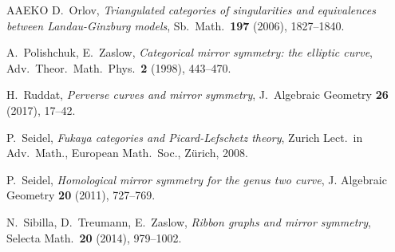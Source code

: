 \begin{thebibliography}{AAEKO}
   D.~Orlov, {\sl Triangulated categories of singularities and equivalences
   between Landau-Ginzburg models}, Sb.\ Math.\ {\bf 197} (2006), 1827--1840.

   A.~Polishchuk, E.~Zaslow,
   {\sl Categorical mirror symmetry: the elliptic curve},
   Adv.\ Theor.\ Math.\ Phys.\ {\bf 2} (1998), 443--470.

   H.~Ruddat,
   {\sl Perverse curves and mirror symmetry},
   J.\ Algebraic Geometry {\bf 26} (2017), 17--42.

   P.~Seidel,
   {\it Fukaya categories and Picard-Lefschetz theory},
   Zurich Lect.\ in Adv.\ Math., European Math.\ Soc., Z\"urich, 2008.

   P.~Seidel, {\sl Homological mirror symmetry for the genus two curve},
   J. Algebraic Geometry {\bf 20} (2011), 727--769.

   N.~Sibilla, D.~Treumann, E.~Zaslow,
   {\sl Ribbon graphs and mirror symmetry},
   Selecta Math.\ {\bf 20} (2014), 979--1002.

\end{thebibliography}

